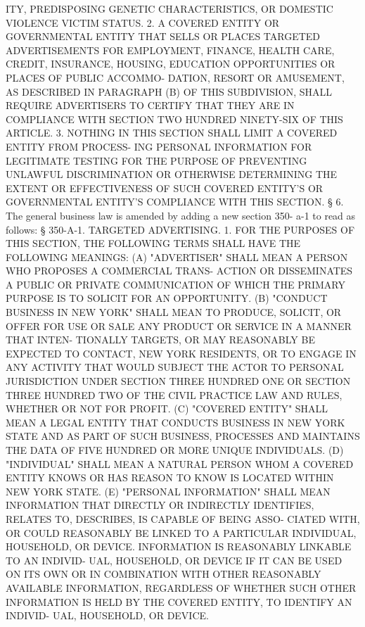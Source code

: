  ITY, PREDISPOSING GENETIC CHARACTERISTICS, OR DOMESTIC  VIOLENCE  VICTIM
 STATUS.
   2.  A  COVERED  ENTITY  OR  GOVERNMENTAL  ENTITY  THAT SELLS OR PLACES
 TARGETED ADVERTISEMENTS FOR EMPLOYMENT, FINANCE,  HEALTH  CARE,  CREDIT,
 INSURANCE, HOUSING, EDUCATION OPPORTUNITIES OR PLACES OF PUBLIC ACCOMMO-
 DATION,  RESORT  OR  AMUSEMENT,  AS  DESCRIBED  IN PARAGRAPH (B) OF THIS
 SUBDIVISION, SHALL REQUIRE ADVERTISERS  TO  CERTIFY  THAT  THEY  ARE  IN
 COMPLIANCE WITH SECTION TWO HUNDRED NINETY-SIX OF THIS ARTICLE.
   3.  NOTHING IN THIS SECTION SHALL LIMIT A COVERED ENTITY FROM PROCESS-
 ING PERSONAL INFORMATION FOR  LEGITIMATE  TESTING  FOR  THE  PURPOSE  OF
 PREVENTING  UNLAWFUL  DISCRIMINATION OR OTHERWISE DETERMINING THE EXTENT
 OR EFFECTIVENESS OF  SUCH  COVERED  ENTITY'S  OR  GOVERNMENTAL  ENTITY'S
 COMPLIANCE WITH THIS SECTION.
   §  6. The general business law is amended by adding a new section 350-
 a-1 to read as follows:
   § 350-A-1. TARGETED ADVERTISING. 1. FOR THE PURPOSES OF THIS  SECTION,
 THE FOLLOWING TERMS SHALL HAVE THE FOLLOWING MEANINGS:
   (A)  "ADVERTISER" SHALL MEAN A PERSON WHO PROPOSES A COMMERCIAL TRANS-
 ACTION OR DISSEMINATES A PUBLIC OR PRIVATE COMMUNICATION  OF  WHICH  THE
 PRIMARY PURPOSE IS TO SOLICIT FOR AN OPPORTUNITY.
   (B)  "CONDUCT BUSINESS IN NEW YORK" SHALL MEAN TO PRODUCE, SOLICIT, OR
 OFFER FOR USE OR SALE ANY PRODUCT OR SERVICE IN  A  MANNER  THAT  INTEN-
 TIONALLY  TARGETS,  OR  MAY  REASONABLY BE EXPECTED TO CONTACT, NEW YORK
 RESIDENTS, OR TO ENGAGE IN ANY ACTIVITY THAT WOULD SUBJECT THE ACTOR  TO
 PERSONAL  JURISDICTION  UNDER SECTION THREE HUNDRED ONE OR SECTION THREE
 HUNDRED TWO OF THE CIVIL PRACTICE LAW AND  RULES,  WHETHER  OR  NOT  FOR
 PROFIT.
   (C)  "COVERED ENTITY" SHALL MEAN A LEGAL ENTITY THAT CONDUCTS BUSINESS
 IN NEW YORK STATE AND AS PART OF SUCH BUSINESS, PROCESSES AND  MAINTAINS
 THE DATA OF FIVE HUNDRED OR MORE UNIQUE INDIVIDUALS.
   (D)  "INDIVIDUAL"  SHALL  MEAN  A NATURAL PERSON WHOM A COVERED ENTITY
 KNOWS OR HAS REASON TO KNOW IS LOCATED WITHIN NEW YORK STATE.
   (E) "PERSONAL INFORMATION" SHALL MEAN  INFORMATION  THAT  DIRECTLY  OR
 INDIRECTLY  IDENTIFIES, RELATES TO, DESCRIBES, IS CAPABLE OF BEING ASSO-
 CIATED WITH, OR COULD REASONABLY BE LINKED TO A  PARTICULAR  INDIVIDUAL,
 HOUSEHOLD,  OR DEVICE. INFORMATION IS REASONABLY LINKABLE TO AN INDIVID-
 UAL, HOUSEHOLD, OR DEVICE IF IT CAN BE USED ON ITS OWN OR IN COMBINATION
 WITH OTHER REASONABLY AVAILABLE INFORMATION, REGARDLESS OF WHETHER  SUCH
 OTHER INFORMATION IS HELD BY THE COVERED ENTITY, TO IDENTIFY AN INDIVID-
 UAL, HOUSEHOLD, OR DEVICE.
